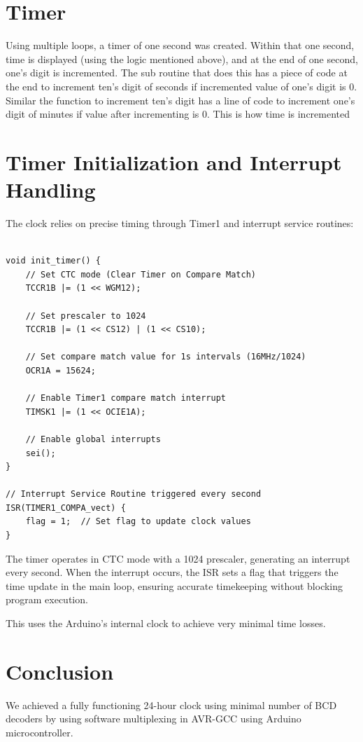 \documentclass[a4paper,12pt]{article}
\begin{document}
\section*{Timer}
Using multiple loops, a timer of one second was created. Within that one second, time is displayed (using the logic mentioned above), and at the end of one second, one's digit is incremented. The sub routine that does this has a piece of code at the end to increment ten's digit of seconds if incremented value of one's digit is 0. Similar the function to increment ten's digit has a line of code to increment one's digit of minutes if value after incrementing is 0. This is how time is incremented
\section*{Timer Initialization and Interrupt Handling}

The clock relies on precise timing through Timer1 and interrupt service routines:

\begin{verbatim}
    
void init_timer() {
    // Set CTC mode (Clear Timer on Compare Match)
    TCCR1B |= (1 << WGM12);
    
    // Set prescaler to 1024
    TCCR1B |= (1 << CS12) | (1 << CS10);

    // Set compare match value for 1s intervals (16MHz/1024)
    OCR1A = 15624;

    // Enable Timer1 compare match interrupt
    TIMSK1 |= (1 << OCIE1A);
    
    // Enable global interrupts
    sei();
}

// Interrupt Service Routine triggered every second
ISR(TIMER1_COMPA_vect) {
    flag = 1;  // Set flag to update clock values
}
\end{verbatim}

The timer operates in CTC mode with a 1024 prescaler, generating an interrupt every second. When the interrupt occurs, the ISR sets a flag that triggers the time update in the main loop, ensuring accurate timekeeping without blocking program execution.
\newline

This uses the Arduino's internal clock to achieve very minimal time losses.
\section*{Conclusion}
We achieved a fully functioning 24-hour clock using minimal number of BCD decoders by using software multiplexing in AVR-GCC using Arduino microcontroller.
\end{document}
